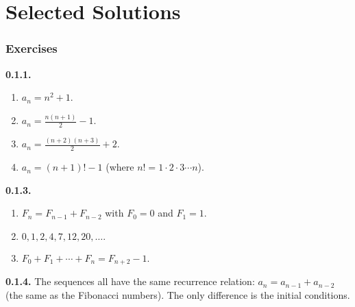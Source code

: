\documentclass[10pt,]{book}
\theoremstyle{plain}
\theoremstyle{definition}
\theoremstyle{definition}
\theoremstyle{definition}
\theoremstyle{definition}
\numberwithin{equation}{chapter}
\begin{document}
\chapter[{Selected Solutions}]{Selected Solutions}\label{appendix-1}
\subsection*{ Exercises}
\noindent\textbf{0.1.1.} \hypertarget{p-83}{}%
\leavevmode%
\begin{enumerate}[label=(\alph*)]
\item\hypertarget{li-58}{}\(a_n = n^2 + 1\).%
\item\hypertarget{li-59}{}\(a_n = \frac{n(n+1)}{2} - 1\).%
\item\hypertarget{li-60}{}\(a_n = \frac{(n+2)(n+3)}{2} + 2\).%
\item\hypertarget{li-61}{}\(a_n = (n+1)! - 1\) (where \(n! = 1 \cdot 2 \cdot 3 \cdots n\)).%
\end{enumerate}
%
\par\smallskip
\noindent\textbf{0.1.3.} \hypertarget{p-94}{}%
\leavevmode%
\begin{enumerate}[label=(\alph*)]
\item\hypertarget{li-69}{}\(F_n = F_{n-1} + F_{n-2}\) with \(F_0 = 0\) and \(F_1 = 1\).%
\item\hypertarget{li-70}{}\(0, 1, 2, 4, 7, 12, 20, \ldots.\)%
\item\hypertarget{li-71}{}\(F_0 + F_1 + \cdots + F_n = F_{n+2} - 1.\)%
\end{enumerate}
%
\par\smallskip
\noindent\textbf{0.1.4.} \hypertarget{p-97}{}%
The sequences all have the same recurrence relation: \(a_n = a_{n-1} + a_{n-2}\) (the same as the Fibonacci numbers). The only difference is the initial conditions.%
\par\smallskip
\end{document}
